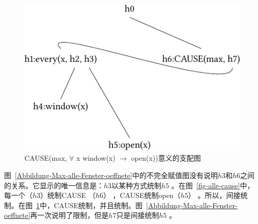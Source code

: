\begin{figure}
\centering

\includegraphics{Figures/solution-mrs-cause-all-open-cropped.pdf}
\caption{CAUSE(max, $\forall$ x window(x) $\to$ open(x))意义的支配图\label{fig-cause-alle}}
\end{figure}%
图~\ref{Abbildung-Max-alle-Fenster-oeffnete}中的不完全赋值图没有说明$h3$和$h6$之间的关系。它显示的唯一信息是：$h3$以某种方式统制$h5$ 。在图~\ref{fig-alle-cause}中，每一个（$h3$）统制CAUSE （$h6$） ，CAUSE统制open（$h5$） 。所以，间接统制。在图~\ref{fig-cause-alle}中，CAUSE统制，并且统制。图~\ref{Abbildung-Max-alle-Fenster-oeffnete}再一次说明了限制，但是$h7$只是间接统制$h5$ 。

